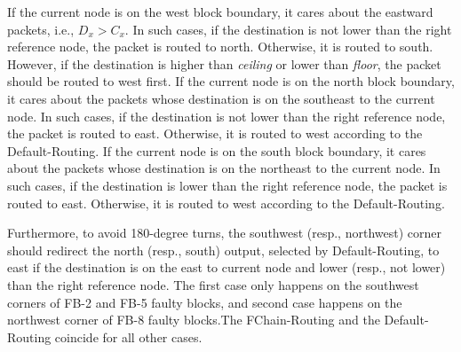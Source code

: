 If the current node is on the west block boundary, it cares about the eastward packets, i.e., $D_{x} > C_{x}$. In such cases, if the destination is not lower than the right reference node, the packet is routed to north. Otherwise, it is routed to south. However, if the destination is higher than \textit{ceiling} or lower than \textit{floor}, the packet should be routed to west first. If the current node is on the north block boundary, it cares about the packets whose destination is on the southeast to the current node. In such cases, if the destination is not lower than the right reference node, the packet is routed to east. Otherwise, it is routed to west according to the Default-Routing. If the current node is on the south block boundary, it cares about the packets whose destination is on the northeast to the current node. In such cases, if the destination is lower than the right reference node, the packet is routed to east. Otherwise, it is routed to west according to the Default-Routing. 

Furthermore, to avoid 180-degree turns, the southwest (resp., northwest) corner should redirect the north (resp., south) output, selected by Default-Routing, to east if the destination is on the east to current node and lower (resp., not lower) than the right reference node. The first case only happens on the southwest corners of FB-2 and FB-5 faulty blocks, and second case happens on the northwest corner of FB-8 faulty blocks.The FChain-Routing and the Default-Routing coincide for all other cases. 

